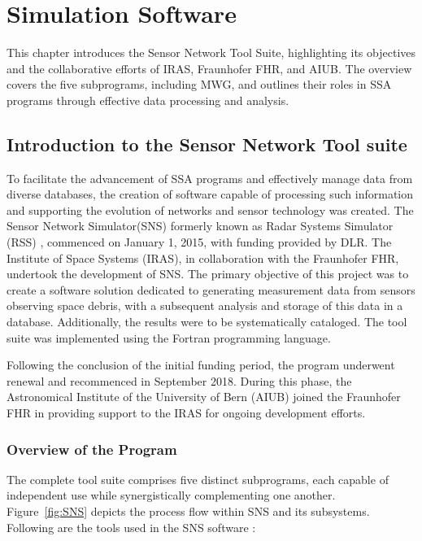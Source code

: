 \chapter{Simulation Software}
\label{sec:hauptteil}
This chapter introduces the Sensor Network Tool Suite, highlighting its objectives and the collaborative efforts of IRAS, Fraunhofer FHR, and AIUB. The overview covers the five subprograms, 
including MWG, and outlines their roles in SSA programs through effective data processing and analysis.\\


\section{Introduction to the Sensor Network Tool suite}

To facilitate the advancement of SSA programs and effectively manage data from diverse databases, the creation of software capable of processing such information and supporting the evolution of networks 
and sensor technology was created. The Sensor Network Simulator(SNS) formerly known as Radar Systems Simulator (RSS) \cite{kebschull2017simulation}, commenced on January 1, 2015, with funding provided by DLR. The Institute of Space Systems (IRAS), in collaboration with the Fraunhofer
FHR, undertook the development of SNS. The primary objective of this project was to create a software solution dedicated to generating measurement data from sensors observing space debris, with a subsequent analysis and storage of this 
data in a database. Additionally, the results were to be systematically cataloged. The tool suite was implemented using the Fortran programming language.

Following the conclusion of the initial funding period, the program underwent renewal and recommenced in September 2018. During this phase, the Astronomical Institute of the University of Bern (AIUB) joined the Fraunhofer FHR in providing 
support to the IRAS for ongoing development efforts.

\subsection{Overview of the Program}

The complete tool suite comprises five distinct subprograms, each capable of independent use while synergistically complementing one another. Figure~\ref{fig:SNS} depicts the process flow within SNS and its subsystems.
Following are the tools used in the SNS software \cite{schubert2023enhancing} :

